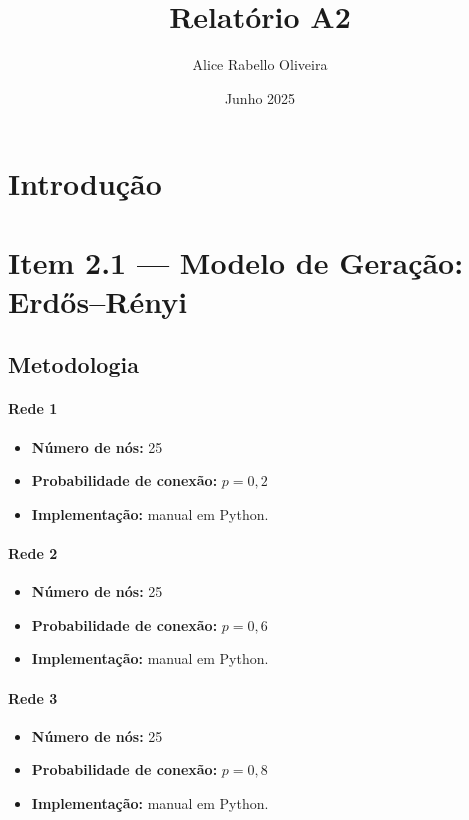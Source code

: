 \documentclass[a4paper]{article}
\title{Relatório A2}
\author{Alice Rabello Oliveira}
\date{Junho 2025}
\begin{document}
\maketitle

\section{Introdução}

\section*{Item 2.1 — Modelo de Geração: Erdős–Rényi}

\subsection*{Metodologia}

\paragraph{Rede 1}
\begin{itemize}
    \item \textbf{Número de nós:} 25
    \item \textbf{Probabilidade de conexão:} \( p = 0{,}2 \)
    \item \textbf{Implementação:} manual em Python.
\end{itemize}

\paragraph{Rede 2}
\begin{itemize}
    \item \textbf{Número de nós:} 25
    \item \textbf{Probabilidade de conexão:} \( p = 0{,}6  \)
    \item \textbf{Implementação:} manual em Python.
\end{itemize}

\paragraph{Rede 3}
\begin{itemize}
    \item \textbf{Número de nós:} 25
    \item \textbf{Probabilidade de conexão:} \( p =  0{,} 8 \)
    \item \textbf{Implementação:} manual em Python.
\end{itemize}
\end{document}
